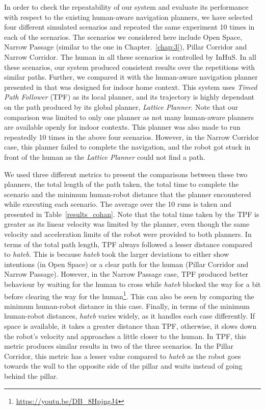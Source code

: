 In order to check the repeatability of our system and evaluate its performance with respect to the existing human-aware navigation planners, we have selected four different simulated scenarios and repeated the same experiment 10 times in each of the scenarios. The scenarios we considered here include Open Space, Narrow Passage (similar to the one in Chapter.~\ref{chap:3}), Pillar Corridor and Narrow Corridor. The human in all these scenarios is controlled by InHuS. In all these scenarios, our system produced consistent results over the repetitions with similar paths. Further, we compared it with the human-aware navigation planner presented in \cite{kollmitz2015time} that was designed for indoor home context. This system uses \textit{Timed Path Follower} (TPF) as its local planner, and its trajectory is highly dependant on the path produced by its global planner, \textit{Lattice Planner}. Note that our comparison was limited to only one planner as not many human-aware planners are available openly for indoor contexts. This planner was also made to run repeatedly 10 times in the above four scenarios. However, in the Narrow Corridor case, this planner failed to complete the navigation, and the robot got stuck in front of the human as the \textit{Lattice Planner} could not find a path.

We used three different metrics to present the comparisons between these two planners, the total length of the path taken, the total time to complete the scenario and the minimum human-robot distance that the planner encountered while executing each scenario. The average over the 10 runs is taken and presented in Table~\ref{results_cohan}. Note that the total time taken by the TPF is greater as its linear velocity was limited by the planner, even though the same velocity and acceleration limits of the robot were provided to both planners. In terms of the total path length, TPF always followed a lesser distance compared to \textit{\acrshort{hateb}}. This is because \textit{\acrshort{hateb}} took the larger deviations to either show intentions (in Open Space) or a clear path for the human (Pillar Corridor and Narrow Passage). However, in the Narrow Passage case, TPF produced better behaviour by waiting for the human to cross while \textit{\acrshort{hateb}} blocked the way for a bit before clearing the way for the human\footnote{\url{https://youtu.be/DB_8HpjngJ4}}. This can also be seen by comparing the minimum human-robot distance in this case. Finally, in terms of the minimum human-robot distances, \textit{\acrshort{hateb}} varies widely, as it handles each case differently. If space is available, it takes a greater distance than TPF, otherwise, it slows down the robot's velocity and approaches a little closer to the human. In TPF, this metric produces similar results in two of the three scenarios. In the Pillar Corridor, this metric has a lesser value compared to \textit{\acrshort{hateb}} as the robot goes towards the wall to the opposite side of the pillar and waits instead of going behind the pillar. 

